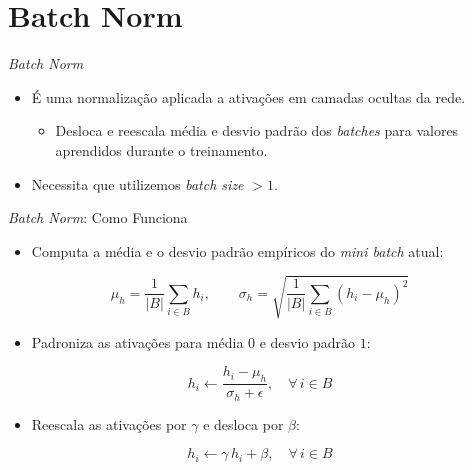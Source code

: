 \documentclass[aspectratio=169,xcolor=dvipsnames]{beamer}
\begin{document}
\section{Batch Norm}

\begin{frame}{\textit{Batch Norm}}
\begin{itemize}
    \item É uma normalização aplicada a ativações em camadas ocultas da rede.
    \begin{itemize}
        \item Desloca e reescala média e desvio padrão dos \textit{batches} para valores aprendidos durante o treinamento.
    \end{itemize}
    \item Necessita que utilizemos \textit{batch size} $> 1$.
\end{itemize}
\end{frame}

\begin{frame}{\textit{Batch Norm}: Como Funciona}
\begin{itemize}
    \item Computa a média e o desvio padrão empíricos do \textit{mini batch} atual:
\end{itemize}
\begin{equation*}
    \mu_h = \frac{1}{|B|}\sum_{i \in B} h_i, \qquad
    \sigma_h = \sqrt{\frac{1}{|B|}\sum_{i \in B} (h_i - \mu_h)^2}
\end{equation*}
\begin{itemize}
    \item Padroniza as ativações para média $0$ e desvio padrão $1$:
\end{itemize}
\begin{equation*}
    h_i \leftarrow \frac{h_i - \mu_h}{\sigma_h + \epsilon}, \quad \forall\, i \in B
\end{equation*}
\begin{itemize}
    \item Reescala as ativações por $\gamma$ e desloca por $\beta$:
\end{itemize}
\begin{equation*}
    h_i \leftarrow \gamma\,h_i + \beta, \quad \forall\, i \in B
\end{equation*}
\end{frame}
\end{document}
